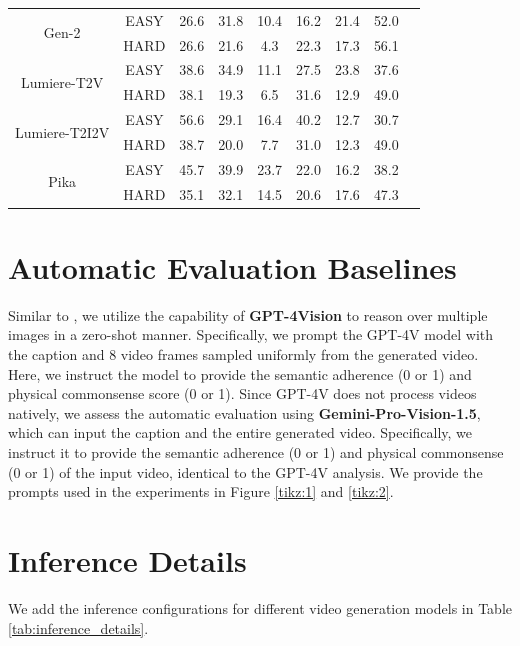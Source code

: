 \begin{table}[htbp]
{\begin{tabular}{ccccccccc}
\multirow{2}{*}{Gen-2} &EASY &26.6 &31.8 &10.4 &16.2 &21.4 &52.0 \\
&HARD &26.6 &21.6 &4.3 &22.3 &17.3 &56.1 \\\cmidrule{1-8}
\multirow{2}{*}{Lumiere-T2V} &EASY &38.6 &34.9 &11.1 &27.5 &23.8 &37.6 \\
&HARD &38.1 &19.3 &6.5 &31.6 &12.9 &49.0 \\\cmidrule{1-8}
\multirow{2}{*}{Lumiere-T2I2V} &EASY &56.6 &29.1 &16.4 &40.2 &12.7 &30.7 \\
&HARD &38.7 &20.0 &7.7 &31.0 &12.3 &49.0 \\\cmidrule{1-8}
\multirow{2}{*}{Pika} &EASY &45.7 &39.9 &23.7 &22.0 &16.2 &38.2 \\
&HARD &35.1 &32.1 &14.5 &20.6 &17.6 &47.3 \\
\bottomrule
\end{tabular}%
}
\end{table}

\section{Automatic Evaluation Baselines}
\label{app:automatic_eval_baselines}

Similar to \cite{bansal2024talc}, we utilize the capability of \textbf{GPT-4Vision} \cite{gpt4v} to reason over multiple images in a zero-shot manner. Specifically, we prompt the GPT-4V model with the caption and $8$ video frames sampled uniformly from the generated video. Here, we instruct the model to provide the semantic adherence (0 or 1) and physical commonsense score (0 or 1). Since GPT-4V does not process videos natively, we assess the automatic evaluation using \textbf{Gemini-Pro-Vision-1.5}, which can input the caption and the entire generated video. Specifically, we instruct it to provide the semantic adherence (0 or 1) and physical commonsense (0 or 1) of the input video, identical to the GPT-4V analysis. We provide the prompts used in the experiments in Figure \ref{tikz:1} and \ref{tikz:2}.


\section{Inference Details}
\label{app:inference_details}
We add the inference configurations for different video generation models in Table \ref{tab:inference_details}.


